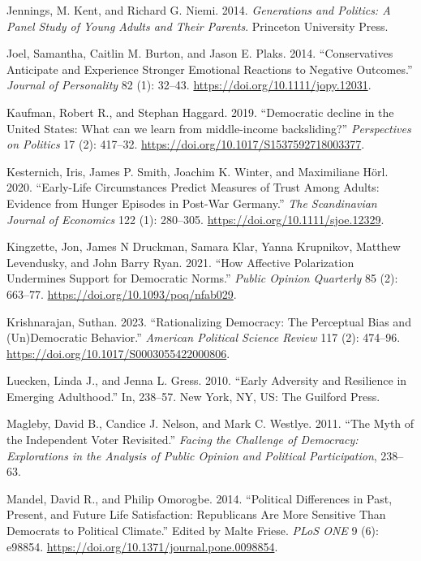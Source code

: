 \documentclass[
  10pt,
  letterpaper,
  DIV=11,
  numbers=noendperiod]{scrartcl}
\newlength{\cslhangindent}
\newenvironment{CSLReferences}[2] %
 {\begin{list}{}{%
  \setlength{\itemindent}{0pt}
  \setlength{\leftmargin}{0pt}
  \setlength{\parsep}{0pt}
  \ifodd #1
   \setlength{\leftmargin}{\cslhangindent}
   \setlength{\itemindent}{-1\cslhangindent}
  \fi
  \setlength{\itemsep}{#2\baselineskip}}}
 {\end{list}}
\begin{document}
\begin{CSLReferences}{1}{0}
Jennings, M. Kent, and Richard G. Niemi. 2014. \emph{Generations and
Politics: A Panel Study of Young Adults and Their Parents}. Princeton
University Press.

Joel, Samantha, Caitlin M. Burton, and Jason E. Plaks. 2014.
{``Conservatives Anticipate and Experience Stronger Emotional Reactions
to Negative Outcomes.''} \emph{Journal of Personality} 82 (1): 32--43.
\url{https://doi.org/10.1111/jopy.12031}.

Kaufman, Robert R., and Stephan Haggard. 2019. {``Democratic decline in
the United States: What can we learn from middle-income backsliding?''}
\emph{Perspectives on Politics} 17 (2): 417--32.
\url{https://doi.org/10.1017/S1537592718003377}.

Kesternich, Iris, James P. Smith, Joachim K. Winter, and Maximiliane
Hörl. 2020. {``Early-Life Circumstances Predict Measures of Trust Among
Adults: Evidence from Hunger Episodes in Post-War Germany.''} \emph{The
Scandinavian Journal of Economics} 122 (1): 280--305.
\url{https://doi.org/10.1111/sjoe.12329}.

Kingzette, Jon, James N Druckman, Samara Klar, Yanna Krupnikov, Matthew
Levendusky, and John Barry Ryan. 2021. {``How Affective Polarization
Undermines Support for Democratic Norms.''} \emph{Public Opinion
Quarterly} 85 (2): 663--77. \url{https://doi.org/10.1093/poq/nfab029}.

Krishnarajan, Suthan. 2023. {``Rationalizing Democracy: The Perceptual
Bias and (Un)Democratic Behavior.''} \emph{American Political Science
Review} 117 (2): 474--96.
\url{https://doi.org/10.1017/S0003055422000806}.

Luecken, Linda J., and Jenna L. Gress. 2010. {``Early Adversity and
Resilience in Emerging Adulthood.''} In, 238--57. New York, NY, US: The
Guilford Press.

Magleby, David B., Candice J. Nelson, and Mark C. Westlye. 2011. {``The
Myth of the Independent Voter Revisited.''} \emph{Facing the Challenge
of Democracy: Explorations in the Analysis of Public Opinion and
Political Participation}, 238--63.

Mandel, David R., and Philip Omorogbe. 2014. {``Political Differences in
Past, Present, and Future Life Satisfaction: Republicans Are More
Sensitive Than Democrats to Political Climate.''} Edited by Malte
Friese. \emph{PLoS ONE} 9 (6): e98854.
\url{https://doi.org/10.1371/journal.pone.0098854}.


\end{CSLReferences}
\end{document}
